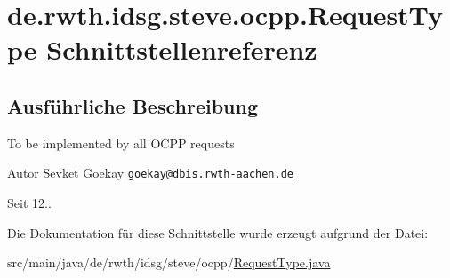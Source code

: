 \hypertarget{interfacede_1_1rwth_1_1idsg_1_1steve_1_1ocpp_1_1_request_type}{\section{de.\-rwth.\-idsg.\-steve.\-ocpp.\-Request\-Type Schnittstellenreferenz}
\label{interfacede_1_1rwth_1_1idsg_1_1steve_1_1ocpp_1_1_request_type}
}


\subsection{Ausführliche Beschreibung}
To be implemented by all O\-C\-P\-P requests

\begin{DoxyAuthor}{Autor}
Sevket Goekay \href{mailto:goekay@dbis.rwth-aachen.de}{\tt goekay@dbis.\-rwth-\/aachen.\-de} 
\end{DoxyAuthor}
\begin{DoxySince}{Seit}
12.. 
\end{DoxySince}


Die Dokumentation für diese Schnittstelle wurde erzeugt aufgrund der Datei\-:\begin{DoxyCompactItemize}
\item 
src/main/java/de/rwth/idsg/steve/ocpp/\hyperlink{_request_type_8java}{Request\-Type.\-java}\end{DoxyCompactItemize}
